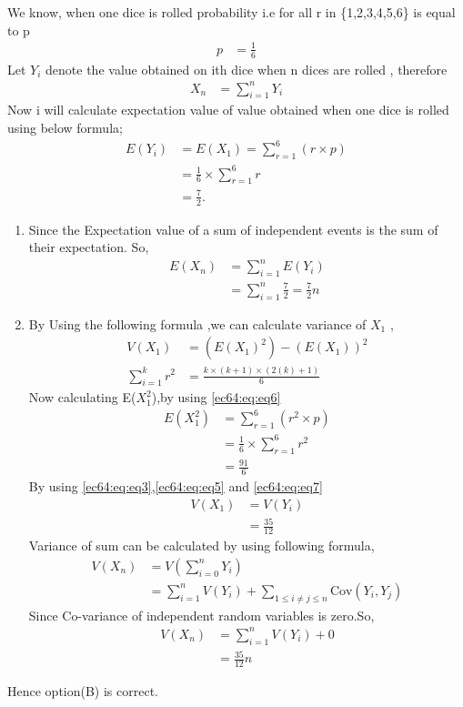 We know, when one dice is rolled probability i.e  for all r in \{1,2,3,4,5,6\} is equal to  p
\begin{align}
    p&=\frac{1}{6}
\end{align}
Let $Y_{i}$ denote the value obtained on ith dice when n dices are rolled  
, therefore 
\begin{align}
  X_{n}&=\sum_{i=1}^n Y_{i}
  \label{ec64:eq:eq1}
\end{align}
Now i will calculate expectation value of value obtained when one dice is rolled
using below formula;
\begin{align}
 E(Y_{i})&= E( X_{1}) =\sum_{r=1}^6 (r\times p)
 \label{ec64:eq:eq2}
\\
&=\frac{1}{6} \times \sum_{r=1}^6 r
\\
&=\frac{7}{2}.
\label{ec64:eq:eq3}
\end{align}
\begin{enumerate}
\item Since the Expectation value of a sum of independent events is the sum of their expectation. So,
\begin{align}
    E(X_{n})&=\sum_{i=1}^n E(Y_{i})
    \\
    & = \sum_{i=1}^n \frac{7}{2} =\frac{7}{2} n 
\label{ec64:eq:eq4}
\end{align}
\item By Using the following formula ,we can calculate variance of  $X_{1}$ ,
\begin{align}
    V(X_{1})&=(E(X_{1})^{2}) - (E(X_{1}))^{2}
    \label{ec64:eq:eq5}
    \\
    \sum_{i=1}^k r^2&=\frac{k\times (k+1 )\times (2(k)+1)}{6}
    \label{ec64:eq:eq6}
\end{align}
Now calculating E($X_{1}^{2}$),by using \eqref{ec64:eq:eq6}
\begin{align}
    E(X_{1}^{2})&=\sum_{r=1}^6(r^{2}\times p)
    \\
    &=\frac{1}{6}\times\sum_{r=1}^6r^{2}
    \\
    &=\frac{91}{6}
    \label{ec64:eq:eq7}
\end{align}
By using \eqref{ec64:eq:eq3},\eqref{ec64:eq:eq5} and \eqref{ec64:eq:eq7}
\begin{align}
    V(X_{1})&=V(Y_{i})
    \\
    &=\frac{35}{12}
    \label{ec64:eq:eq8}
\end{align}
Variance of sum can be calculated by using following formula,
\begin{align}
    V(X_{n})&=V(\sum_{i=0}^n Y_{i})
    \\
    &= \sum_{i=1}^n V(Y_{i}) + \sum_{1\leq i\not=j \leq n}\text{Cov}(Y_{i},Y_{j})
\end{align}
Since Co-variance of independent random variables is zero.So,
\begin{align}
    V(X_{n})&=\sum_{i=1}^n V(Y_{i}) + 0
    \\
    &=\frac{35}{12}n
\end{align}
\end{enumerate}
    Hence option(B) is correct.